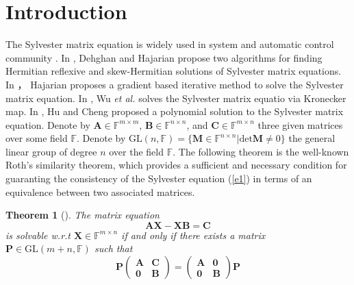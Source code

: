 \documentclass[preprint,12pt,authoryear]{elsarticle}
\theoremstyle{cupthm}
\newtheorem{thm}{Theorem}[section]
\theoremstyle{cupdefn}
\theoremstyle{cuprem}
\numberwithin{equation}{section}
\begin{document}
\section{Introduction}
The Sylvester matrix equation is widely used in system and automatic control community \cite{1,2,3,4,5}. In \cite{1}, Dehghan and Hajarian propose two algorithms for finding Hermitian reflexive and skew-Hermitian solutions of Sylvester matrix equations. In \cite{2}， Hajarian proposes a gradient based iterative method to solve the Sylvester matrix equation. In \cite{3}, Wu \textsl{et al.} solves the Sylvester matrix equatio via Kronecker map. In \cite{4}, Hu and Cheng proposed a polynomial solution to the Sylvester matrix equation. Denote by $\bm{A}\in\mathbb{F}^{m\times m}$, $\bm{B}\in\mathbb{F}^{n\times n}$, and $\bm{C}\in\mathbb{F}^{m\times n}$ three given matrices over some field $\mathbb{F}$. Denote by $\text{GL}(n,\mathbb{F})=\{\bm{M}\in\mathbb{F}^{n\times n}|\text{det}\bm{M}\neq0\}$ the general linear group of degree $n$ over the field $\mathbb{F}$. The following theorem is the well-known Roth's similarity theorem, which provides a sufficient and necessary condition for guaranting the consistency of the Sylvester equation (\ref{e1}) in terms of an equivalence between two associated matrices.



\begin{thm}[\cite{5}] The matrix equation 
\begin{equation}
\label{e1}
\bm{A}\bm{X}-\bm{X}\bm{B}=\bm{C}
\end{equation}
is solvable w.r.t $\bm{X}\in\mathbb{F}^{m\times n}$ if and only if there exists a matrix $\bm{P}\in\text{GL}(m+n,\mathbb{F})$ such that 
\[
\bm{P}
\left(
\begin{array}{cc}
\bm{A} & \bm{C} \\
\bm{0} & \bm{B}
\end{array}
\right)
=
\left(
\begin{array}{cc}
\bm{A} & \bm{0} \\
\bm{0} & \bm{B}
\end{array}
\right)
\bm{P}
\]
\end{thm}
\end{document}
